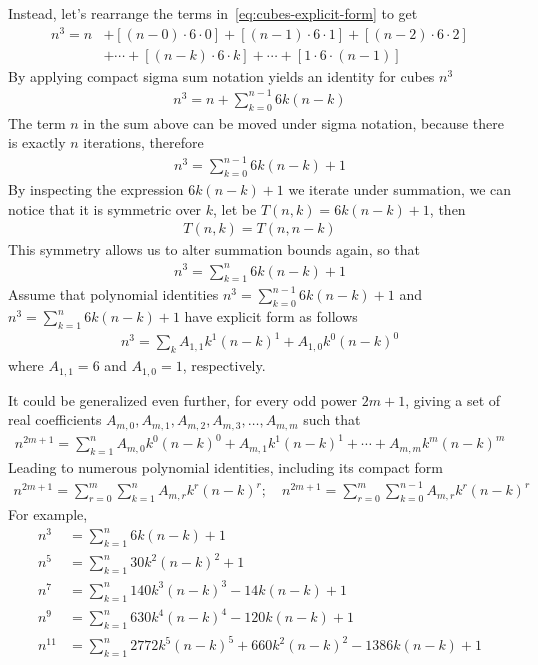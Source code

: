 Instead, let's rearrange the terms in~\eqref{eq:cubes-explicit-form} to get
\begin{align}
    \label{eq:rearrange}
    n^3 = n &+ [(n-0) \cdot 6 \cdot 0] + [(n-1)\cdot6\cdot1] + [(n-2)\cdot6\cdot2] \\
    &+ \cdots + [(n-k)\cdot 6 \cdot k] + \cdots + [1\cdot6\cdot(n-1)] \nonumber
\end{align}
By applying compact sigma sum notation yields an identity for cubes $n^3$
\begin{align*}
    n^3 = n + \sum_{k=0}^{n-1} 6k(n-k)
\end{align*}
The term $n$ in the sum above can be moved under sigma notation, because there is exactly $n$ iterations, therefore
\begin{align}
    \label{eq:cubes-sigma-notation}
    n^3 = \sum_{k=0}^{n-1} 6k(n-k) + 1
\end{align}
By inspecting the expression $6k(n-k) + 1$ we iterate under summation,
we can notice that it is symmetric over $k$, let be $T(n,k) = 6k(n-k) + 1$, then
\begin{align*}
    T(n,k) = T(n,n-k)
\end{align*}
This symmetry allows us to alter summation bounds again, so that
\begin{align}
    \label{eq:cubes-sigma-alter-summation-bounds}
    n^3 = \sum_{k=1}^{n} 6k(n-k) + 1
\end{align}
Assume that polynomial identities
$n^3 = \sum_{k=0}^{n-1} 6k(n-k) + 1$ and $n^3 = \sum_{k=1}^{n} 6k(n-k) + 1$
have explicit form as follows
\begin{align*}
    n^3 = \sum_{k} A_{1,1} k^1(n-k)^1 + A_{1,0} k^0(n-k)^0
\end{align*}
where $A_{1,1} = 6$ and $A_{1,0} = 1$, respectively.

It could be generalized even further, for every odd power $2m+1$, giving a set of real coefficients
$A_{m,0}, A_{m,1},A_{m,2},A_{m,3}, \ldots, A_{m,m}$ such that
\begin{align}
    \label{eq:odd-power-generalized}
    n^{2m+1} = \sum_{k=1}^{n} A_{m,0} k^0 (n-k)^0 + A_{m,1} k^1 (n-k)^1
    + \cdots + A_{m,m} k^m (n-k)^m
\end{align}
Leading to numerous polynomial identities, including its compact form
\begin{align*}
    n^{2m+1} = \sum_{r=0}^{m} \sum_{k=1}^{n} A_{m,r} k^r (n-k)^r; \quad n^{2m+1} = \sum_{r=0}^{m} \sum_{k=0}^{n-1} A_{m,r} k^r (n-k)^r
\end{align*}
For example,
\begin{align*}
    n^3 &= \sum_{k=1}^{n} 6k(n-k) + 1 \\
    n^5 &= \sum_{k=1}^{n} 30k^2(n-k)^2 + 1 \\
    n^7 &= \sum_{k=1}^{n} 140 k^3 (n-k)^3 - 14k(n-k) + 1 \\
    n^9 &= \sum_{k=1}^{n} 630 k^4(n-k)^4 - 120k(n-k) + 1 \\
    n^{11} &= \sum_{k=1}^{n} 2772 k^5(n-k)^5 + 660 k^2(n-k)^2 - 1386k(n-k) + 1
\end{align*}

